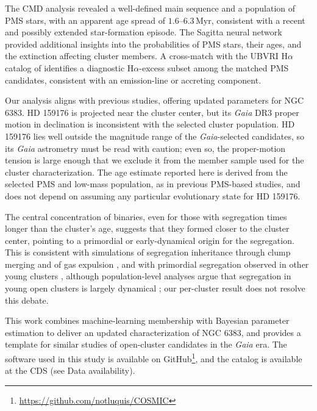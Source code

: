 \documentclass{aa}
\begin{document}
The CMD analysis revealed a well-defined main sequence and a population of PMS stars, with an apparent age spread of $1.6$--$6.3\,\mathrm{Myr}$, consistent with a recent and possibly extended star-formation episode. The Sagitta neural network provided additional insights into the probabilities of PMS stars, their ages, and the extinction affecting cluster members. A cross-match with the UBVRI H$\alpha$ catalog of \citet{2010AA...511A..25R} identifies a diagnostic H$\alpha$-excess subset among the matched PMS candidates, consistent with an emission-line or accreting component.

Our analysis aligns with previous studies, offering updated parameters for NGC 6383. HD 159176 is projected near the cluster center, but its \textit{Gaia} DR3 proper motion in declination is inconsistent with the selected cluster population. HD 159176 lies well outside the magnitude range of the \textit{Gaia}-selected candidates, so its \textit{Gaia} astrometry must be read with caution; even so, the proper-motion tension is large enough that we exclude it from the member sample used for the cluster characterization. The age estimate reported here is derived from the selected PMS and low-mass population, as in previous PMS-based studies, and does not depend on assuming any particular evolutionary state for HD 159176.

The central concentration of binaries, even for those with segregation times longer than the cluster's age, suggests that they formed closer to the cluster center, pointing to a primordial or early-dynamical origin for the segregation. This is consistent with simulations of segregation inheritance through clump merging and of gas expulsion \citep{2007ApJ...655L..45M,2007MNRAS.380.1589B}, and with primordial segregation observed in other young clusters \citep{2007AJ....134.1368C,2008AJ....135..173S}, although population-level analyses argue that segregation in young open clusters is largely dynamical \citep{2026AJ....171..236Z,2026arXiv260604509A}; our per-cluster result does not resolve this debate.

This work combines machine-learning membership with Bayesian parameter estimation to deliver an updated characterization of NGC 6383, and provides a template for similar studies of open-cluster candidates in the \textit{Gaia} era. The software used in this study is available on GitHub\footnote{\href{https://github.com/notluquis/COSMIC}{https://github.com/notluquis/COSMIC}}, and the catalog is available at the CDS (see Data availability).
\end{document}
